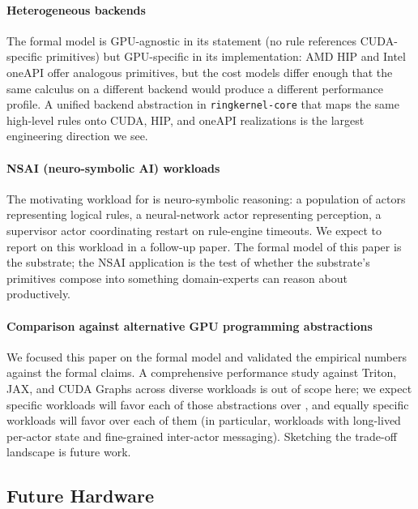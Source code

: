 \paragraph{Heterogeneous backends}
The formal model is GPU-agnostic in its statement (no rule
references CUDA-specific primitives) but GPU-specific in its
implementation: AMD HIP and Intel oneAPI offer analogous
primitives, but the cost models differ enough that the same
calculus on a different backend would produce a different
performance profile.  A unified backend abstraction in
\texttt{ringkernel-core} that maps the same high-level rules onto
CUDA, HIP, and oneAPI realizations is the largest engineering
direction we see.

\paragraph{NSAI (neuro-symbolic AI) workloads}
The motivating workload for \system{} is neuro-symbolic
reasoning: a population of actors representing logical rules, a
neural-network actor representing perception, a supervisor
actor coordinating restart on rule-engine timeouts.  We expect to
report on this workload in a follow-up paper.  The formal model
of this paper is the substrate; the NSAI application is the test
of whether the substrate's primitives compose into something
domain-experts can reason about productively.

\paragraph{Comparison against alternative GPU programming abstractions}
We focused this paper on the formal model and validated the
empirical numbers against the formal claims.  A comprehensive
performance study against Triton, JAX, and CUDA Graphs across
diverse workloads is out of scope here; we expect specific
workloads will favor each of those abstractions over \system{},
and equally specific workloads will favor \system{} over each of
them (in particular, workloads with long-lived per-actor state and
fine-grained inter-actor messaging).  Sketching the trade-off
landscape is future work.

\subsection{Future Hardware}
\label{sec:disc:hw}

